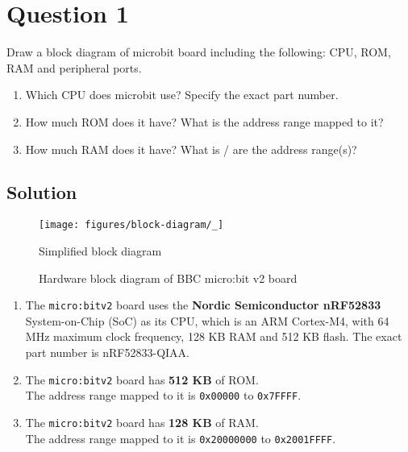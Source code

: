 \section*{Question 1}

Draw a block diagram of microbit board including the following: CPU, ROM, RAM and peripheral ports.

\begin{enumerate}[label = (\alph*)]
    \item Which CPU does microbit use? Specify the exact part number.
    \item How much ROM does it have? What is the address range mapped to it?
    \item How much RAM does it have? What is / are the address range(s)?
\end{enumerate}

\subsection*{Solution}

\begin{figure*}[htbp]
    \centering
    \texttt{[image: figures/block-diagram/\_]}
    \caption{
        Simplified block diagram
    }\label{fig:simple-block-diagram}
\end{figure*}

\begin{figure*}[htbp]
    \centering
    
    \caption{
        Hardware block diagram of BBC micro:bit v2 board
    }\label{fig:block-diagram-microbit}
\end{figure*}

\newcommand{\hex}[1]{\texttt{#1}}
\begin{enumerate}[label = (\alph*)]
    \item The \texttt{micro:bit\;v2} board uses the \textbf{Nordic Semiconductor nRF52833} System-on-Chip (SoC) as its CPU, which is an ARM Cortex-M4, with 64 MHz maximum clock frequency, 128 KB RAM and 512 KB flash.
          The exact part number is nRF52833-QIAA.\@
    \item The \texttt{micro:bit\;v2} board has \textbf{512 KB} of ROM.\\
          The address range mapped to it is \hex{0x00000} to \hex{0x7FFFF}.
    \item The \texttt{micro:bit\;v2} board has \textbf{128 KB} of RAM.\\
          The address range mapped to it is \hex{0x20000000} to \hex{0x2001FFFF}.
\end{enumerate}
